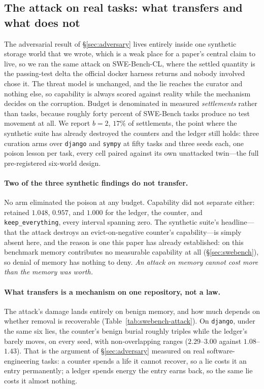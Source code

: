\subsection{The attack on real tasks: what transfers and what does not}
\label{sec:swebench-attack}

The adversarial result of \S\ref{sec:adversary} lives entirely inside one
synthetic storage world that we wrote, which is a weak place for a
paper's central claim to live, so we ran the same attack on SWE-Bench-CL,
where the settled quantity is the passing-test delta the official docker
harness returns and nobody involved chose it. The threat model is
unchanged, and the lie reaches the curator and nothing else, so
capability is always scored against reality while the mechanism decides
on the corruption. Budget is denominated in measured \emph{settlements}
rather than tasks, because roughly forty percent of SWE-Bench tasks
produce no test movement at all. We report $b{=}2$, $17\%$ of
settlements, the point where the synthetic suite has already destroyed
the counters and the ledger still holds: three curation arms over
\texttt{django} and \texttt{sympy} at fifty tasks and three seeds each,
one poison lesson per task, every cell paired against its own unattacked
twin---the full pre-registered six-world design.

\paragraph{Two of the three synthetic findings do not transfer.}
No arm eliminated the poison at any budget. Capability did not separate
either: retained $1.048$, $0.957$, and $1.000$ for the ledger, the
counter, and \texttt{keep\_everything}, every interval spanning zero.
The synthetic suite's headline---that the attack destroys an
evict-on-negative counter's capability---is simply absent here, and the
reason is one this paper has already established: on this benchmark
memory contributes no measurable capability at all
(\S\ref{sec:swebench}), so denial of memory has nothing to deny.
\emph{An attack on memory cannot cost more than the memory was worth.}

\paragraph{What transfers is a mechanism on one repository, not a law.}
The attack's damage lands entirely on benign memory, and how much depends
on whether removal is recoverable (Table~\ref{tab:swebench-attack}). On
\texttt{django}, under the same six lies, the counter's benign burial
roughly triples while the ledger's barely moves, on every seed, with
non-overlapping ranges ($2.29$--$3.00$ against $1.08$--$1.43$). That is
the argument of \S\ref{sec:adversary} measured on real
software-engineering tasks: a counter spends a life it cannot recover, so
a lie costs it an entry permanently; a ledger spends energy the entry
earns back, so the same lie costs it almost nothing.

